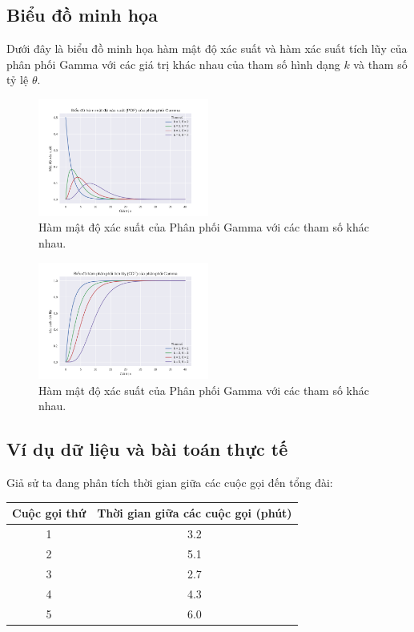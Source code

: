 	\subsection{Biểu đồ minh họa}
	Dưới đây là biểu đồ minh họa hàm mật độ xác suất 
	và hàm xác suất tích lũy của phân phối Gamma với các giá trị khác nhau của tham số hình dạng 
	$k$ và tham số tỷ lệ $\theta$.
	
	\begin{figure}[h!]
		\centering
		\includegraphics[width=0.5\textwidth]{images/Gamma Distribution-PDF.png} %
		\caption{Hàm mật độ xác suất của Phân phối Gamma với các tham số khác nhau.}
		\label{fig:Gamma Distribution-PDF}
	\end{figure}
	\begin{figure}[h!]
		\centering
		\includegraphics[width=0.5\textwidth]{images/Gamma Distribution-CDF.png} %
		\caption{Hàm mật độ xác suất của Phân phối Gamma với các tham số khác nhau.}
		\label{fig:Gamma Distribution-CDF}
	\end{figure}
	

	\newpage
	\subsection{Ví dụ dữ liệu và bài toán thực tế}

	Giả sử ta đang phân tích thời gian giữa các cuộc gọi đến tổng đài:

	\begin{center}
	\begin{tabular}{|c|c|}
	\hline
	Cuộc gọi thứ & Thời gian giữa các cuộc gọi (phút) \\
	\hline
	1 & 3.2 \\
	2 & 5.1 \\
	3 & 2.7 \\
	4 & 4.3 \\
	5 & 6.0 \\
	\hline
	\end{tabular}
	\end{center}

